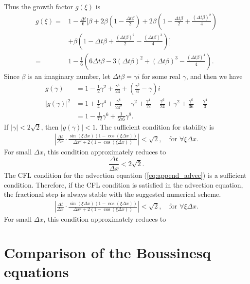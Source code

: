 Thus the growth factor $g(\xi)$ is
\begin{align*}
g(\xi)= & 1-\frac{\Delta t}{6}\bigg[ \beta + 
2 \beta \left(1-\frac{\Delta t\beta}{2} \right) +
2 \beta\left(1- \frac{\Delta t\beta}{2}+\frac{(\Delta t\beta)^2}{4} \right) \\ 
&+ \beta \left(1-\Delta t\beta
+ \frac{(\Delta t\beta)^2}{2}-\frac{(\Delta t\beta)^3}{4} \right)
\bigg] \\
= & 1-\frac{1}{6}\left(
6\Delta t\beta -3(\Delta t\beta)^2 +(\Delta t\beta)^3-\frac{(\Delta t\beta)^4}{4}
\right).
\end{align*}
Since $\beta$ is an imaginary number,
let $\Delta t\beta= \gamma i$ for some real $\gamma$, and then we have
\begin{align*}
g(\gamma) & = 1-
\frac{1}{2}\gamma^2 +\frac{\gamma^4}{24} + \left(\frac{\gamma^3}{6} -\gamma \right)i \\
|g(\gamma)|^2 & = 1 + \frac{1}{4}\gamma^4 + \frac{\gamma^8}{24^2} -\gamma^2 + \frac{\gamma^4}{12}
-\frac{\gamma^6}{24} + \gamma^2 + \frac{\gamma^6}{36} -\frac{\gamma^4}{3} \\
& = 1 -\frac{1}{72}\gamma^6 + \frac{1}{576}\gamma^8.
\end{align*}
If $|\gamma|<2\sqrt{2}$, then $|g(\gamma)|<1$. 
The sufficient condition for stability is 
\begin{align}
\left| \frac{\Delta t}{\Delta x} \cdot \frac{ \sin(\xi \Delta x)(1-  \cos(\xi \Delta x)) }
                     { \Delta x^2 +2(1-\cos(\xi \Delta x))} \right| < \sqrt{2}, 
                     \quad \textrm{for~} \forall \xi \Delta x.
\end{align}
For small $\Delta x$, this condition approximately reduces to
\[
\frac{\Delta t}{\Delta x} < 2\sqrt{2}.
\]
The CFL condition for the advection equation
(\ref{eq:append_advec}) is a sufficient condition. 
Therefore, if the CFL condition is satisfied in the advection equation,
the fractional step is always stable with the suggested numerical scheme. 
\begin{align}
\left| \frac{\Delta t}{\Delta x} \cdot \frac{ \sin(\xi \Delta x)(1-  \cos(\xi \Delta x)) }
                     { \Delta x^2 +2(1-\cos(\xi \Delta x))} \right| < \sqrt{2}, 
                     \quad \textrm{for~} \forall \xi \Delta x.
\end{align}
For small $\Delta x$, this condition approximately reduces to

\section{Comparison of the Boussinesq equations}
\label{append:a}


